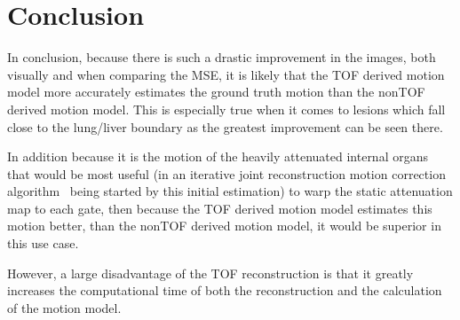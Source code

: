 \documentclass[9pt]{IEEEtran}
\begin{document}
%

\section{Conclusion}
In conclusion, because there is such a drastic improvement in the images, both visually and when comparing the MSE, it is likely that the TOF derived motion model more accurately estimates the ground truth motion than the nonTOF derived motion model. This is especially true when it comes to lesions which fall close to the lung/liver boundary as the greatest improvement can be seen there.

In addition because it is the motion of the heavily attenuated internal organs that would be most useful (in an iterative joint reconstruction motion correction algorithm~\cite{Bousse2016a} being started by this initial estimation) to warp the static attenuation map to each gate, then because the TOF derived motion model estimates this motion better, than the nonTOF derived motion model, it would be superior in this use case.

However, a large disadvantage of the TOF reconstruction is that it greatly increases the computational time of both the reconstruction and the calculation of the motion model.
\end{document}
